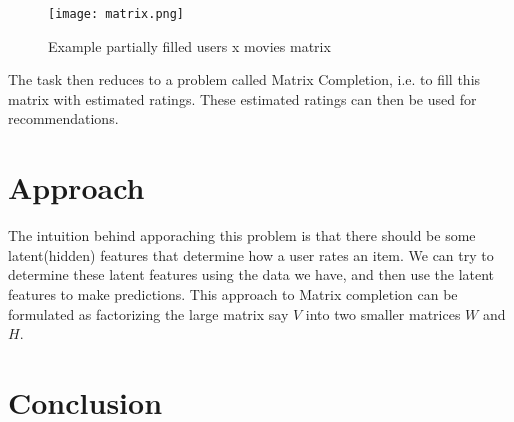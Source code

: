\documentclass[a4paper,11pt]{article}
\begin{document}
\begin{figure}[h]
   \centering
    \texttt{[image: matrix.png]}
    \caption{Example partially filled users x movies matrix}
   \label{fig:matrix}
\end{figure}

The task then reduces to a problem called Matrix Completion, i.e. to fill this matrix with estimated ratings. These estimated ratings can then be used for recommendations.
\section{Approach}
The intuition behind apporaching this problem is that there should be some latent(hidden) features that determine how a user rates an item. We can try to determine these latent features using the data we have, and then use the latent features to make predictions. This approach to Matrix completion can be formulated as factorizing the large matrix say $V$ into two smaller matrices $W$ and $H$. 
\section{Conclusion}
\begin{thebibliography}{9}
  

\end{thebibliography}
\end{document}
